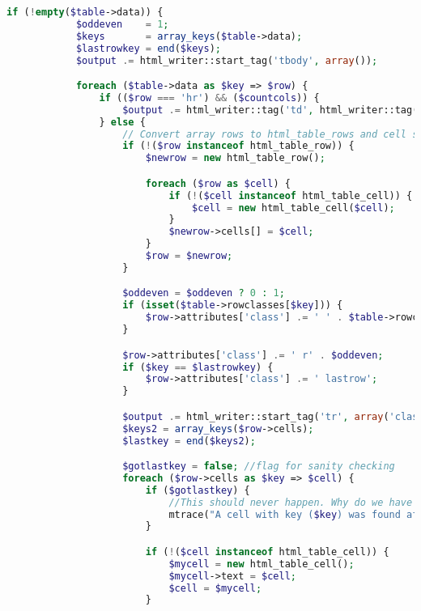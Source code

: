\begin{lstlisting}[language=PHP]
        if (!empty($table->data)) {
            $oddeven    = 1;
            $keys       = array_keys($table->data);
            $lastrowkey = end($keys);
            $output .= html_writer::start_tag('tbody', array());

            foreach ($table->data as $key => $row) {
                if (($row === 'hr') && ($countcols)) {
                    $output .= html_writer::tag('td', html_writer::tag('div', '', array('class' => 'tabledivider')), array('colspan' => $countcols));
                } else {
                    // Convert array rows to html_table_rows and cell strings to html_table_cell objects
                    if (!($row instanceof html_table_row)) {
                        $newrow = new html_table_row();

                        foreach ($row as $cell) {
                            if (!($cell instanceof html_table_cell)) {
                                $cell = new html_table_cell($cell);
                            }
                            $newrow->cells[] = $cell;
                        }
                        $row = $newrow;
                    }

                    $oddeven = $oddeven ? 0 : 1;
                    if (isset($table->rowclasses[$key])) {
                        $row->attributes['class'] .= ' ' . $table->rowclasses[$key];
                    }

                    $row->attributes['class'] .= ' r' . $oddeven;
                    if ($key == $lastrowkey) {
                        $row->attributes['class'] .= ' lastrow';
                    }

                    $output .= html_writer::start_tag('tr', array('class' => trim($row->attributes['class']), 'style' => $row->style, 'id' => $row->id)) . "\n";
                    $keys2 = array_keys($row->cells);
                    $lastkey = end($keys2);

                    $gotlastkey = false; //flag for sanity checking
                    foreach ($row->cells as $key => $cell) {
                        if ($gotlastkey) {
                            //This should never happen. Why do we have a cell after the last cell?
                            mtrace("A cell with key ($key) was found after the last key ($lastkey)");
                        }

                        if (!($cell instanceof html_table_cell)) {
                            $mycell = new html_table_cell();
                            $mycell->text = $cell;
                            $cell = $mycell;
                        }


\end{lstlisting}
